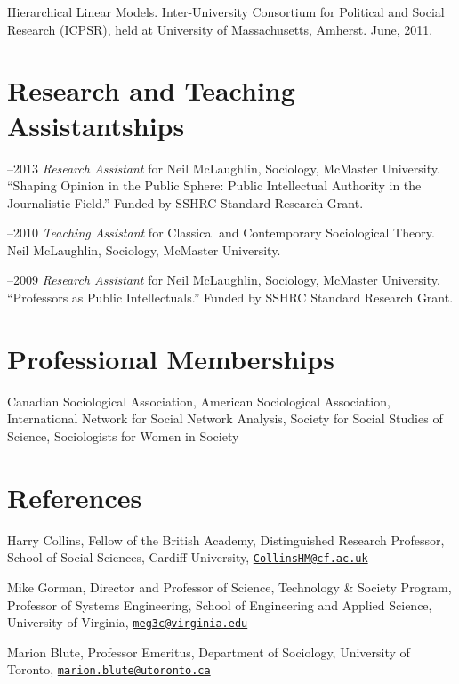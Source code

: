 \ind Hierarchical Linear Models. Inter-University Consortium for
Political and Social Research (ICPSR), held at University of
Massachusetts, Amherst. June, 2011.

\section{Research and Teaching
Assistantships}\label{research-and-teaching-assistantships}

--2013 \emph{Research Assistant} for Neil McLaughlin,
Sociology, McMaster University. ``Shaping Opinion in the Public Sphere:
Public Intellectual Authority in the Journalistic Field.'' Funded by
SSHRC Standard Research Grant.

--2010 \emph{Teaching Assistant} for Classical and Contemporary
Sociological Theory. Neil McLaughlin, Sociology, McMaster University.

--2009 \emph{Research Assistant} for Neil McLaughlin,
Sociology, McMaster University. ``Professors as Public Intellectuals.''
Funded by SSHRC Standard Research Grant.

\section{Professional Memberships}\label{professional-memberships}

\noindent Canadian Sociological Association, American Sociological
Association, International Network for Social Network Analysis, Society
for Social Studies of Science, Sociologists for Women in Society

\section{References}\label{references}

\ind Harry Collins, Fellow of the British Academy, Distinguished
Research Professor, School of Social Sciences, Cardiff University,
\href{mailto:CollinsHM@cf.ac.uk}{\nolinkurl{CollinsHM@cf.ac.uk}}

\ind Mike Gorman, Director and Professor of Science, Technology \&
Society Program, Professor of Systems Engineering, School of Engineering
and Applied Science, University of Virginia,
\href{mailto:meg3c@virginia.edu}{\nolinkurl{meg3c@virginia.edu}}

\ind Marion Blute, Professor Emeritus, Department of Sociology,
University of Toronto,
\href{mailto:marion.blute@utoronto.ca}{\nolinkurl{marion.blute@utoronto.ca}}

